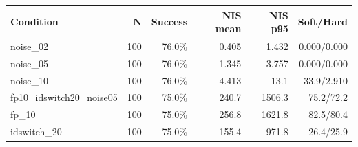 \begin{tabular}{lrrrrr}
\toprule
\textbf{Condition} & \textbf{N} & \textbf{Success} & \textbf{NIS mean} & \textbf{NIS p95} & \textbf{Soft/Hard} \\
\midrule
noise\_02 & 100 & 76.0\% & 0.405 & 1.432 & 0.000/0.000 \\
noise\_05 & 100 & 76.0\% & 1.345 & 3.757 & 0.000/0.000 \\
noise\_10 & 100 & 76.0\% & 4.413 & 13.1 & 33.9/2.910 \\
fp10\_idswitch20\_noise05 & 100 & 75.0\% & 240.7 & 1506.3 & 75.2/72.2 \\
fp\_10 & 100 & 75.0\% & 256.8 & 1621.8 & 82.5/80.4 \\
idswitch\_20 & 100 & 75.0\% & 155.4 & 971.8 & 26.4/25.9 \\
\bottomrule
\end{tabular}
